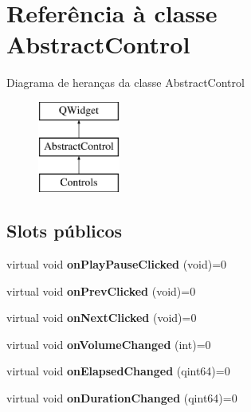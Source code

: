 \hypertarget{class_abstract_control}{\section{Referência à classe Abstract\-Control}
\label{class_abstract_control}
}
Diagrama de heranças da classe Abstract\-Control\begin{figure}[H]
\begin{center}
\leavevmode
\includegraphics[height=3.000000cm]{class_abstract_control}
\end{center}
\end{figure}
\subsection*{Slots públicos}
\begin{DoxyCompactItemize}
\item 
\hypertarget{class_abstract_control_a99d0d68402b7546c624e6bb7696ee95d}{virtual void {\bfseries on\-Play\-Pause\-Clicked} (void)=0}\label{class_abstract_control_a99d0d68402b7546c624e6bb7696ee95d}

\item 
\hypertarget{class_abstract_control_abdb7309086319e82a30dfbccea290d60}{virtual void {\bfseries on\-Prev\-Clicked} (void)=0}\label{class_abstract_control_abdb7309086319e82a30dfbccea290d60}

\item 
\hypertarget{class_abstract_control_a45d6fe6a83a66ae6f69e3b631fbdd547}{virtual void {\bfseries on\-Next\-Clicked} (void)=0}\label{class_abstract_control_a45d6fe6a83a66ae6f69e3b631fbdd547}

\item 
\hypertarget{class_abstract_control_a0d76bc546bc9bb2be13573814f43ede2}{virtual void {\bfseries on\-Volume\-Changed} (int)=0}\label{class_abstract_control_a0d76bc546bc9bb2be13573814f43ede2}

\item 
\hypertarget{class_abstract_control_a4aa7cd659eddd599b03df5d905cc1806}{virtual void {\bfseries on\-Elapsed\-Changed} (qint64)=0}\label{class_abstract_control_a4aa7cd659eddd599b03df5d905cc1806}

\item 
\hypertarget{class_abstract_control_a536755040aecaba6aff81a1704801ef6}{virtual void {\bfseries on\-Duration\-Changed} (qint64)=0}\label{class_abstract_control_a536755040aecaba6aff81a1704801ef6}

\end{DoxyCompactItemize}
